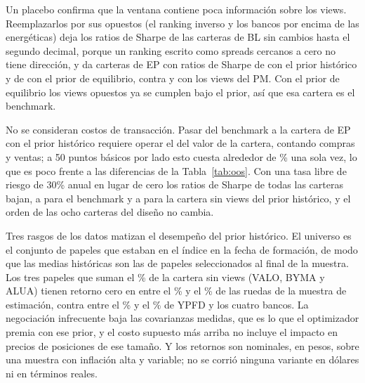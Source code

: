 \documentclass[11pt]{article}
\begin{document}
Un placebo confirma que la ventana contiene poca informaci\'on sobre los
views. Reemplazarlos por sus opuestos (el ranking inverso y los bancos por
encima de las energ\'eticas) deja los ratios de Sharpe de las carteras de BL sin cambios hasta el
segundo decimal, porque un ranking escrito como spreads cercanos a cero no tiene
direcci\'on, y da carteras de EP con ratios de Sharpe de \nShPlaceboEP{} con
el prior hist\'orico y de \nShPlaceboEPeq{} con el prior de equilibrio,
contra \nShEP{} y \nShEPeq{} con los views del PM. Con el prior de
equilibrio los views opuestos ya se cumplen bajo el prior, as\'i que esa
cartera es el benchmark.

No se consideran costos de transacci\'on. Pasar del benchmark a la cartera
de EP con el prior hist\'orico requiere operar el \nTurnEP{} del valor de la
cartera, contando compras y ventas; a 50 puntos b\'asicos por lado esto
cuesta alrededor de \nCostEP\% una sola vez, lo que es poco frente a las
diferencias de la Tabla~\ref{tab:oos}. Con una tasa libre de riesgo de
30\% anual en lugar de cero los ratios de Sharpe de todas las carteras
bajan, a \nShBenchRf{} para el benchmark y a \nShMVhistRf{} para la cartera
sin views del prior hist\'orico, y el orden de las ocho carteras del
dise\~no no cambia.

Tres rasgos de los datos matizan el desempe\~no del prior hist\'orico. El
universo es el conjunto de papeles que estaban en el \'indice en la fecha de
formaci\'on, de modo que las medias hist\'oricas son las de papeles
seleccionados al final de la muestra. Los tres papeles que suman el
\nWIlliq\% de la cartera sin views (VALO, BYMA y ALUA) tienen retorno cero
en entre el \nZeroIlliqMin\% y el \nZeroIlliqMax\% de las ruedas de la
muestra de estimaci\'on, contra entre el \nZeroLiqMin\% y el
\nZeroLiqMax\% de YPFD y los cuatro bancos. La negociaci\'on infrecuente
baja las covarianzas medidas, que es lo que el optimizador premia con ese
prior, y el costo supuesto m\'as arriba no incluye el impacto en precios de
posiciones de ese tama\~no. Y los retornos son nominales, en pesos, sobre
una muestra con inflaci\'on alta y variable; no se corri\'o ninguna variante
en d\'olares ni en t\'erminos reales.
\end{document}
